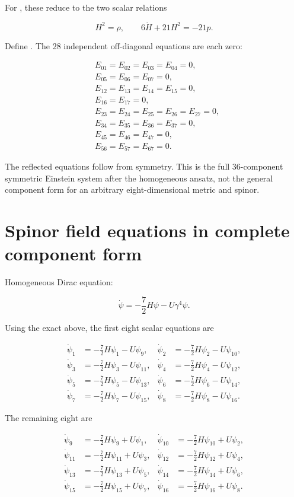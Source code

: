 \documentclass[11pt]{article}
\begin{document}
For \texttt{}, these reduce to the two scalar relations

\[
\boxed{H^2=\rho},
\qquad
\boxed{6\dot H+21H^2=-21p}.
\]

Define \texttt{}. The 28 independent off-diagonal equations are each zero:

\[
\begin{aligned}
&E_{01}=E_{02}=E_{03}=E_{04}=0,\\
&E_{05}=E_{06}=E_{07}=0,\\
&E_{12}=E_{13}=E_{14}=E_{15}=0,\\
&E_{16}=E_{17}=0,\\
&E_{23}=E_{24}=E_{25}=E_{26}=E_{27}=0,\\
&E_{34}=E_{35}=E_{36}=E_{37}=0,\\
&E_{45}=E_{46}=E_{47}=0,\\
&E_{56}=E_{57}=E_{67}=0.
\end{aligned}
\]

The reflected equations \texttt{} follow from symmetry. This is the full 36-component symmetric Einstein system after the homogeneous ansatz, not the general component form for an arbitrary eight-dimensional metric and spinor.

\section{Spinor field equations in complete component form}

Homogeneous Dirac equation:

\[
\dot\psi=-\frac72H\psi-U\gamma^4\psi.
\]

Using the exact \texttt{} above, the first eight scalar equations are

\[
\begin{aligned}
\dot\psi_1&=-\frac72H\psi_1-U\psi_9,&
\dot\psi_2&=-\frac72H\psi_2-U\psi_{10},\\
\dot\psi_3&=-\frac72H\psi_3-U\psi_{11},&
\dot\psi_4&=-\frac72H\psi_4-U\psi_{12},\\
\dot\psi_5&=-\frac72H\psi_5-U\psi_{13},&
\dot\psi_6&=-\frac72H\psi_6-U\psi_{14},\\
\dot\psi_7&=-\frac72H\psi_7-U\psi_{15},&
\dot\psi_8&=-\frac72H\psi_8-U\psi_{16}.
\end{aligned}
\]

The remaining eight are

\[
\begin{aligned}
\dot\psi_9&=-\frac72H\psi_9+U\psi_1,&
\dot\psi_{10}&=-\frac72H\psi_{10}+U\psi_2,\\
\dot\psi_{11}&=-\frac72H\psi_{11}+U\psi_3,&
\dot\psi_{12}&=-\frac72H\psi_{12}+U\psi_4,\\
\dot\psi_{13}&=-\frac72H\psi_{13}+U\psi_5,&
\dot\psi_{14}&=-\frac72H\psi_{14}+U\psi_6,\\
\dot\psi_{15}&=-\frac72H\psi_{15}+U\psi_7,&
\dot\psi_{16}&=-\frac72H\psi_{16}+U\psi_8.
\end{aligned}
\]
\end{document}
